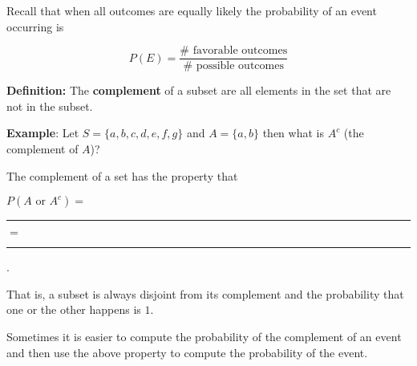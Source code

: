 \documentclass[oneside]{amsart}
\theoremstyle{definition}
\theoremstyle{definition}
\begin{document}
\vspace{2mm}

Recall that when all outcomes are equally likely the probability of an event occurring is


$$ P(E) = \displaystyle \frac{\# \text{ favorable outcomes}}{\# \text{ possible outcomes}}$$

\vspace{2mm}


\begin{ovalbox}{\begin{minipage}{6.8in}
\vspace{5mm}

\textbf{Definition:} The \textbf{complement} of a subset are all elements in the set that are not in the subset.   \\

\vspace{7mm}

\end{minipage}}
\end{ovalbox}

\vspace{5mm}

   \textbf{Example}: Let $S = \{a,b,c,d,e,f,g \}$ and $A = \{a,b \}$ then what is $A^c$ (the complement of $A$)?
    
    \vfill


\begin{ovalbox}{\begin{minipage}{6.8in}
\vspace{5mm}

The complement of a set has the property that  \\
\begin{center}
  $P(A \text{ or } A^c)= $\rule[-2mm]{35mm}{.1mm} $=$\rule[-2mm]{35mm}{.1mm}.
\end{center}
\vspace{2mm}
That is, a subset is always disjoint from its complement and the probability that one or the other happens is $1$.
\vspace{7mm}

\end{minipage}}
\end{ovalbox}

\vspace{3mm}

\newpage

Sometimes it is easier to compute the probability of the complement of an event and then use the above property to compute the probability of the event.
\end{document}
